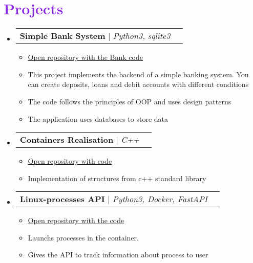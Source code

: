 \documentclass[letterpaper,11pt]{article}
\makeatletter
\newcommand{\resumeItem}[1]{
  \item\small{
    {#1 \vspace{-2pt}}
  }
}
\newcommand{\resumeSubheading}[4]{
  \vspace{-2pt}\item
    \begin{tabular*}{1.0\textwidth}[t]{l@{\extracolsep{\fill}}r}
      \textbf{#1} & \textbf{\small #2} \\
      \textit{\small#3} & \textit{\small #4} \\
    \end{tabular*}\vspace{-7pt}
}
\newcommand{\resumeProjectHeading}[2]{
    \item
    \begin{tabular*}{1.001\textwidth}{l@{\extracolsep{\fill}}r}
      \small#1 & \textbf{\small #2}\\
    \end{tabular*}\vspace{-7pt}
}
\newcommand{\resumeSubHeadingListStart}{\begin{itemize}[leftmargin=0.0in, label={}]}
\newcommand{\resumeSubHeadingListEnd}{\end{itemize}}
\newcommand{\resumeItemListStart}{\begin{itemize}}
\newcommand{\resumeItemListEnd}{\end{itemize}\vspace{-5pt}}
\makeatother
\begin{document}
    

\section{\textcolor{BlueViolet}{Projects}}
    \vspace{-5pt}
    \resumeSubHeadingListStart
      \resumeProjectHeading
          {\textbf{Simple Bank System} $|$ \emph{Python3, sqlite3}}{}
          \resumeItemListStart
            \resumeItem{\href{https://github.com/dmsuty/Simple-Bank-System}{\textcolor{Emerald}{\underline{Open repository with the Bank code}}}}
            \resumeItem{This project implements the backend of a simple banking system. You can create deposits, loans and debit accounts with different conditions}
            \resumeItem{The code follows the principles of OOP and uses design patterns}
            \resumeItem{The application uses databases to store data}
          \resumeItemListEnd
          \vspace{-13pt}
      \resumeProjectHeading
        {\textbf{Containers Realisation} $|$ \emph{C++}}{}
          \resumeItemListStart
            \resumeItem{\href{https://github.com/dmsuty/std-containers}{\textcolor{Emerald}{\underline{Open repository with code}}}}
            \resumeItem{Implementation of structures from c++ standard library}
          \resumeItemListEnd
          \vspace{-13pt}
      \resumeProjectHeading
          {\textbf{Linux-processes API} $|$ \emph{Python3, Docker, FastAPI}}{}
          \resumeItemListStart
            \resumeItem{\href{https://github.com/dmsuty/Linux-Process-API}{\textcolor{Emerald}{\underline{Open repository with the code}}}}
            \resumeItem{Launchs processes in the container.}
            \resumeItem{Gives the API to track information about process to user}
          \resumeItemListEnd
    \resumeSubHeadingListEnd
\vspace{-15pt}
\end{document}
